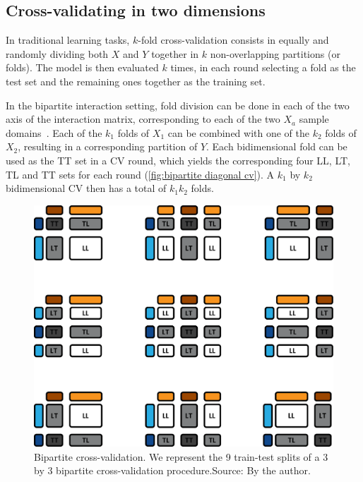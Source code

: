 \subsection{Cross-validating in two dimensions}
\label{sec:cross_validation}

In traditional learning tasks, $k$-fold cross-validation consists in equally and randomly dividing both $X$ and $Y$ together in $k$ non-overlapping partitions (or folds). The model is then evaluated $k$ times, in each round selecting a fold as the test set and the remaining ones together as the training set.

In the bipartite interaction setting, fold division can be done in each of the two axis of the interaction matrix, corresponding to each of the two $X_a$ sample domains~\cite{vert2008reconstruction,pahikkala2015more}. Each of the $k_1$ folds of $X_1$ can be combined with one of the $k_2$ folds of $X_2$, resulting in a corresponding partition of $Y$. Each bidimensional fold can be used as the TT set in a CV round, which yields the corresponding four LL, LT, TL and TT sets for each round (\autoref{fig:bipartite diagonal cv}). A $k_1$ by $k_2$ bidimensional CV then has a total of $k_1k_2$ folds.

\begin{figure}[tb]
    \centering
    \includegraphics[width=\textwidth]{figures/cv.pdf}
    \caption{Bipartite cross-validation. We represent the 9 train-test splits of a 3 by 3 bipartite cross-validation procedure.\newline Source: By the author.}
    \label{fig:bipartite cv}
\end{figure}

